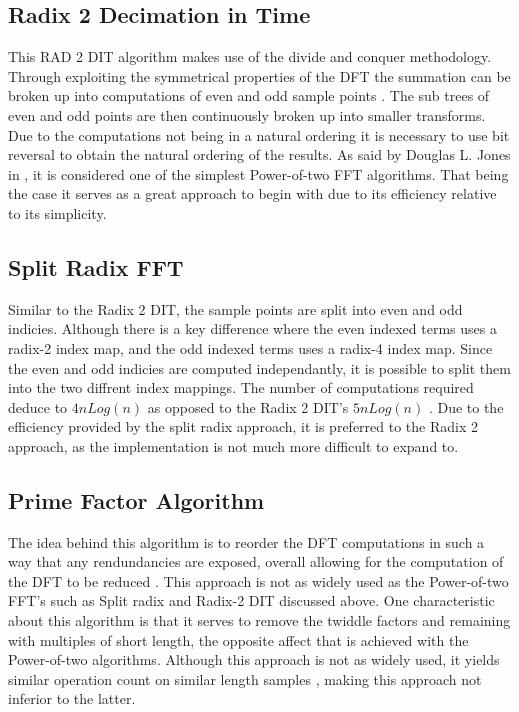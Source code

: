 \documentclass[journal]{IEEEtran}
\begin{document}
	\subsection{Radix 2 Decimation in Time}
		\par{
			This RAD 2 DIT algorithm makes use of the divide and conquer methodology. Through exploiting 
			the symmetrical properties of the DFT the summation can be broken up into computations of even 
			and odd sample points \cite{Soni}. The sub trees of even and odd points are then continuously 
			broken up into smaller transforms. Due to the computations not being in a natural ordering 
			it is necessary to use bit reversal to obtain the natural ordering of the results. As said by 
			Douglas L. Jones in \cite{Cnx}, it is considered one of the simplest Power-of-two FFT algorithms. 
			That being the case it serves as a great approach to begin with due to its efficiency relative to 
			its simplicity.
		}
	\subsection{Split Radix FFT}
		\par{
			Similar to the Radix 2 DIT, the sample points are split into even and odd indicies. Although there is 
			a key difference where the even indexed terms uses a radix-2 index map, and the odd indexed terms uses 
			a radix-4 index map. Since the even and odd indicies are computed independantly, it is possible to split 
			them into the two diffrent index mappings. The number of computations required deduce to ${4n Log(n)}$ 
			as opposed to the Radix 2 DIT's ${5n Log(n)}$ \cite{Soni}. Due to the efficiency provided by the split 
			radix approach, it is preferred to the Radix 2 approach, as the implementation is not much more difficult 
			to expand to.
		}

	\subsection{Prime Factor Algorithm}
		\par{
			The idea behind this algorithm is to reorder the DFT computations in such a way that any rendundancies 
			are exposed, overall allowing for the computation of the DFT to be reduced \cite{Cnx}. 
			This approach is not as widely used as the Power-of-two FFT's such as Split radix and Radix-2 DIT discussed above. 
			One characteristic about this algorithm is that it serves to remove the twiddle factors and remaining with multiples 
			of short length, the opposite affect that is achieved with the Power-of-two algorithms. Although this approach is not 
			as widely used, it yields similar operation count on similar length samples \cite{Cnx}, making this approach not 
			inferior to the latter.
		}
\end{document}
